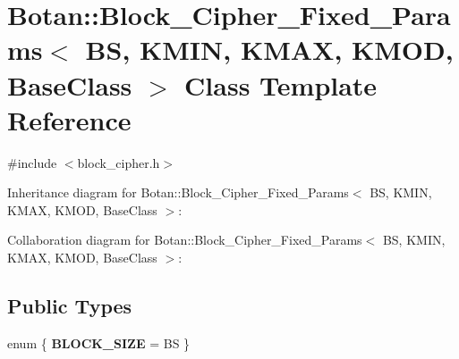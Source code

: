 \hypertarget{class_botan_1_1_block___cipher___fixed___params}{}\section{Botan\+:\+:Block\+\_\+\+Cipher\+\_\+\+Fixed\+\_\+\+Params$<$ BS, K\+M\+IN, K\+M\+AX, K\+M\+OD, Base\+Class $>$ Class Template Reference}
\label{class_botan_1_1_block___cipher___fixed___params}


{\ttfamily \#include $<$block\+\_\+cipher.\+h$>$}



Inheritance diagram for Botan\+:\+:Block\+\_\+\+Cipher\+\_\+\+Fixed\+\_\+\+Params$<$ BS, K\+M\+IN, K\+M\+AX, K\+M\+OD, Base\+Class $>$\+:


Collaboration diagram for Botan\+:\+:Block\+\_\+\+Cipher\+\_\+\+Fixed\+\_\+\+Params$<$ BS, K\+M\+IN, K\+M\+AX, K\+M\+OD, Base\+Class $>$\+:
\subsection*{Public Types}
\begin{DoxyCompactItemize}
\item 
\mbox{\label{class_botan_1_1_block___cipher___fixed___params_acf09ca1f26b5301907fadb78fb398912}} 
enum \{ {\bfseries B\+L\+O\+C\+K\+\_\+\+S\+I\+ZE} = BS
 \}
\end{DoxyCompactItemize}
